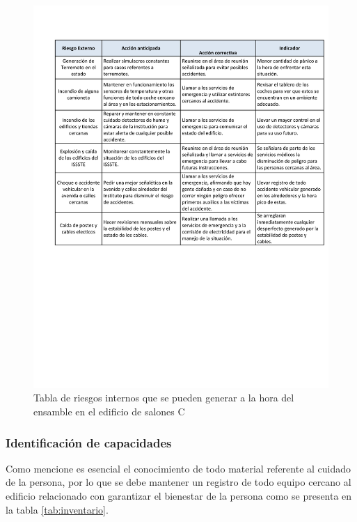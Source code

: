     \begin{figure}[H]
        \centering
        \includegraphics[trim = {1mm 100mm 1mm 1mm},clip,scale=0.35]{19/Img/accionAntiExt.pdf}
        \caption{Tabla de riesgos internos que se pueden generar a la hora del ensamble en el edificio de salones C}
        \label{fig:accionAntiExt}
    \end{figure}
     
     \subsubsection{Identificación de capacidades}

Como mencione es esencial el conocimiento de todo material referente al cuidado de la persona, por lo que se debe mantener un registro de todo equipo cercano al edificio relacionado con garantizar el bienestar de la persona como se presenta en la tabla \ref{tab:inventario}.

